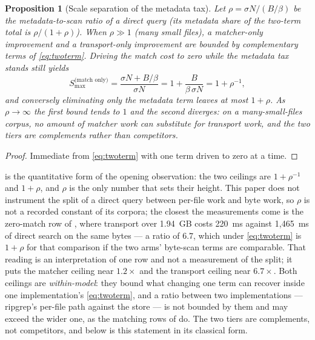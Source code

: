 \documentclass[11pt,letterpaper]{article}
\newtheorem{proposition}{Proposition}
\begin{document}
\begin{proposition}[Scale separation of the metadata tax]
\label{prop:separation}
Let $\rho = \sigma N / (B/\beta)$ be the metadata-to-scan ratio of a
direct query (its metadata \emph{share} of the two-term total is
$\rho/(1+\rho)$).
When $\rho \gg 1$ (many small files), a matcher-only improvement and a
transport-only improvement are bounded by complementary terms of
\eqref{eq:twoterm}. Driving the match cost to zero while the metadata tax
stands still yields
\begin{equation}
\label{eq:smax}
S_{\max}^{\text{(match only)}} = \frac{\sigma N + B/\beta}{\sigma N}
  = 1 + \frac{B}{\beta\,\sigma N} = 1 + \rho^{-1} ,
\end{equation}
and conversely eliminating only the metadata term leaves at most
$1 + \rho$. As $\rho \to \infty$ the first bound tends to $1$ and the
second diverges: on a many-small-files corpus, no amount of matcher work
can substitute for transport work, and the two tiers are complements
rather than competitors.
\end{proposition}

\begin{proof}
Immediate from \eqref{eq:twoterm} with one term driven to zero at a time.
\end{proof}

 is the quantitative form of the opening
observation: the two ceilings are $1+\rho^{-1}$ and $1+\rho$, and $\rho$
is the only number that sets their height. This paper does not instrument
the split of a direct query between per-file work and byte work, so
$\rho$ is not a recorded constant of its corpora; the closest the
measurements come is the zero-match row of , where
transport over 1.94~GB costs 220~ms against 1{,}465~ms of direct search
on the same bytes --- a ratio of $6.7$, which under \eqref{eq:twoterm} is
$1+\rho$ for that comparison if the two arms' byte-scan terms are
comparable. That reading is an interpretation of one row and not a
measurement of the split; it puts the matcher ceiling near $1.2\times$
and the transport ceiling near $6.7\times$. Both ceilings are
\emph{within-model}: they bound what changing one term can recover inside
one implementation's \eqref{eq:twoterm}, and a ratio between two
implementations --- ripgrep's per-file path against the store --- is not
bounded by them and may exceed the wider one, as the matching rows of
 do. The two tiers are complements, not competitors, and
 below is this statement in its classical form.
\end{document}

